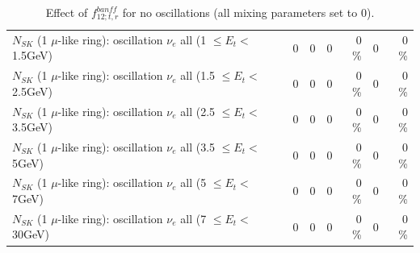 \begin{table}
\begin{tabular}{| l | r | r | r  r | r  r |}
$N_{SK}$ (1 $\mu$-like ring): oscillation $\nu_{e}$ all (1 $\leq E_{t} <$ 1.5GeV) &               0 &               0 &               0 &        0 \%  &               0 &        0 \%  \\ 
$N_{SK}$ (1 $\mu$-like ring): oscillation $\nu_{e}$ all (1.5 $\leq E_{t} <$ 2.5GeV) &               0 &               0 &               0 &        0 \%  &               0 &        0 \%  \\ 
$N_{SK}$ (1 $\mu$-like ring): oscillation $\nu_{e}$ all (2.5 $\leq E_{t} <$ 3.5GeV) &               0 &               0 &               0 &        0 \%  &               0 &        0 \%  \\ 
$N_{SK}$ (1 $\mu$-like ring): oscillation $\nu_{e}$ all (3.5 $\leq E_{t} <$ 5GeV) &               0 &               0 &               0 &        0 \%  &               0 &        0 \%  \\ 
 $N_{SK}$ (1 $\mu$-like ring): oscillation $\nu_{e}$ all (5 $\leq E_{t} <$ 7GeV) &               0 &               0 &               0 &        0 \%  &               0 &        0 \%  \\ 
$N_{SK}$ (1 $\mu$-like ring): oscillation $\nu_{e}$ all (7 $\leq E_{t} <$ 30GeV) &               0 &               0 &               0 &        0 \%  &               0 &        0 \%  \\ 
\hline
\hline
\end{tabular}
\caption{ Effect of $f_{12; t, r}^{banff}$ for no oscillations (all mixing parameters set to 0). }
\label{tab:num_banff_12_1RmuT_3f_osc_t13:0}
\end{table}
\clearpage
